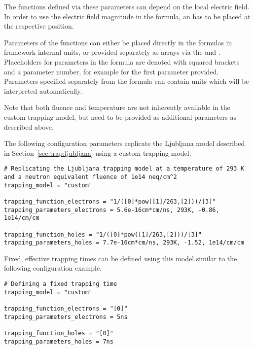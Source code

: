The functions defined via these parameters can depend on the local electric field.
In order to use the electric field magnitude in the formula, an  has to be placed at the respective position.

Parameters of the functions can either be placed directly in the formulas in framework-internal units, or provided separately as arrays via the  and .
Placeholders for parameters in the formula are denoted with squared brackets and a parameter number, for example \parameter{[0]} for the first parameter provided.
Parameters specified separately from the formula can contain units which will be interpreted automatically.

\begin{warning}
Note that both fluence and temperature are not inherently available in the custom trapping model, but need to be provided as additional parameters as described above.
\end{warning}

The following configuration parameters replicate the Ljubljana model described in Section~\ref{sec:trap:ljubljana} using a custom trapping model.
\begin{verbatim}
# Replicating the Ljubljana trapping model at a temperature of 293 K and a neutron equivalent fluence of 1e14 neq/cm^2
trapping_model = "custom"

trapping_function_electrons = "1/([0]*pow([1]/263,[2]))/[3]"
trapping_parameters_electrons = 5.6e-16cm*cm/ns, 293K, -0.86, 1e14/cm/cm

trapping_function_holes = "1/([0]*pow([1]/263,[2]))/[3]"
trapping_parameters_holes = 7.7e-16cm*cm/ns, 293K, -1.52, 1e14/cm/cm
\end{verbatim}

Fixed, effective trapping times can be defined using this model similar to the following configuration example.
\begin{verbatim}
# Defining a fixed trapping time
trapping_model = "custom"

trapping_function_electrons = "[0]"
trapping_parameters_electrons = 5ns

trapping_function_holes = "[0]"
trapping_parameters_holes = 7ns
\end{verbatim}
